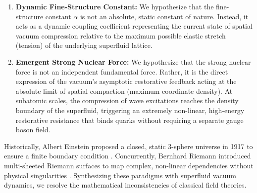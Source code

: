 \documentclass[11pt,a4paper]{article}
\theoremstyle{plain}
\theoremstyle{definition}
\theoremstyle{remark}
\begin{document}
\begin{enumerate}
    \item \textbf{Dynamic Fine-Structure Constant:} 
    We hypothesize that the fine-structure constant $\alpha$ is not an absolute, static constant of nature. Instead, it acts as a dynamic coupling coefficient representing the current state of spatial vacuum compression relative to the maximum possible elastic stretch (tension) of the underlying superfluid lattice.
    
    \item \textbf{Emergent Strong Nuclear Force:} 
    We hypothesize that the strong nuclear force is not an independent fundamental force. Rather, it is the direct expression of the vacuum's asymptotic restorative feedback acting at the absolute limit of spatial compaction (maximum coordinate density). At subatomic scales, the compression of wave excitations reaches the density boundary of the superfluid, triggering an extremely non-linear, high-energy restorative resistance that binds quarks without requiring a separate gauge boson field.
\end{enumerate}

Historically, Albert Einstein proposed a closed, static 3-sphere universe in 1917 to ensure a finite boundary condition \cite{einstein1917}. Concurrently, Bernhard Riemann introduced multi-sheeted Riemann surfaces to map complex, non-linear dependencies without physical singularities \cite{riemann1857}. Synthesizing these paradigms with superfluid vacuum dynamics, we resolve the mathematical inconsistencies of classical field theories.
\end{document}

